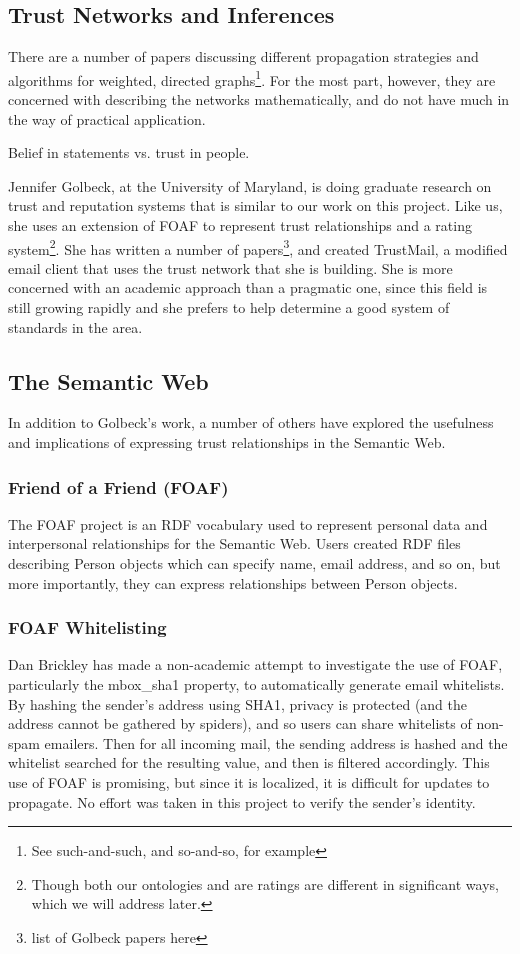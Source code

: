 \documentclass[onecolumn]{acm_proc_article-sp}
\begin{document}
\subsection{Trust Networks and Inferences}
There are a number of papers discussing different propagation strategies and algorithms for weighted, directed graphs\footnote{See such-and-such, and so-and-so, for example}.  For the most part, however, they are concerned with describing the networks mathematically, and do not have much in the way of practical application. 

Belief in statements vs. trust in people.

Jennifer Golbeck, at the University of Maryland, is doing graduate research on trust and reputation systems\cite{golbeckSite} that is similar to our work on this project.  Like us, she uses an extension of FOAF to represent trust relationships and a rating system\footnote{Though both our ontologies and are ratings are different in significant ways, which we will address later.}.  She has written a number of papers\footnote{list of Golbeck papers here}, and created TrustMail\cite{trustMail}, a modified email client that uses the trust network that she is building.  She is more concerned with an academic approach than a pragmatic one, since this field is still growing rapidly and she prefers to help determine a good system of standards in the area.

\subsection{The Semantic Web}
In addition to Golbeck's work, a number of others have explored the usefulness and implications of expressing trust relationships in the Semantic Web.

\subsubsection{Friend of a Friend (FOAF)}
The FOAF project\cite{foafProject} is an RDF vocabulary used to represent personal data and interpersonal relationships for the Semantic Web.  Users created RDF files describing Person objects which can specify name, email address, and so on, but more importantly, they can express relationships between Person objects.  

\subsubsection{FOAF Whitelisting}
Dan Brickley has made a non-academic attempt to investigate the use of FOAF, particularly the mbox\_sha1 property, to automatically generate email whitelists. By hashing the sender's address using SHA1, privacy is protected (and the address cannot be gathered by spiders), and so users can share whitelists of non-spam emailers. Then for all incoming mail, the sending address is hashed and the whitelist searched for the resulting value, and then is filtered accordingly. This use of FOAF is promising, but since it is localized, it is difficult for updates to propagate\cite{foafWhitelisting}. No effort was taken in this project to verify the sender's identity.
\end{document}
